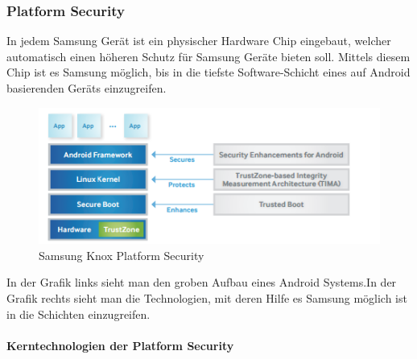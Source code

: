 \subsubsection{Platform Security}
In jedem Samsung Gerät ist ein physischer Hardware Chip eingebaut, welcher automatisch einen höheren Schutz für Samsung Geräte bieten soll. Mittels diesem Chip ist es Samsung möglich, bis in die tiefste Software-Schicht eines auf Android basierenden Geräts einzugreifen.
\begin{figure}[H]
\includegraphics[scale=0.9]{Images/samsung_knox_platform_security}
\caption{Samsung Knox Platform Security}
\end{figure}
In der Grafik links sieht man den groben Aufbau eines Android Systems.In der Grafik rechts sieht man die Technologien, mit deren Hilfe es Samsung möglich ist in die Schichten einzugreifen.
\paragraph{Kerntechnologien der Platform Security}



